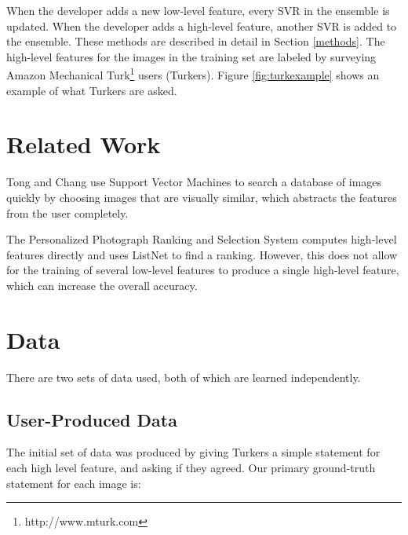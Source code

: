 \documentclass[11pt,letter]{article}
\begin{document}
When the developer adds a new low-level feature, every SVR in the ensemble is updated. When the developer adds a high-level feature, another SVR is added to the ensemble. These methods are described in detail in Section \ref{methods}. The high-level features for the images in the training set are labeled by surveying Amazon Mechanical Turk\footnote{http://www.mturk.com} users (Turkers). Figure \ref{fig:turkexample} shows an example of what Turkers are asked.

\begin{figure*}[h!]
  \centering
  \caption{This is what Turkers see when rating the image. Here, there are two high level features: blur quality and exposure quality. The first statement (``This image is high quality'') is the ground truth. See Section \ref{turkdata} for details.}
  \label{fig:turkexample}
\end{figure*}

\section{Related Work}
Tong and Chang\cite{Tong:2001:SVM:500141.500159} use Support Vector Machines to search a database of images quickly by choosing images that are visually similar, which abstracts the features from the user completely.

The Personalized Photograph Ranking and Selection System\cite{Yeh:2010:PPR:1873951.1873963} computes high-level features directly and uses ListNet\cite{Cao:2007:LRP:1273496.1273513} to find a ranking. However, this does not allow for the training of several low-level features to produce a single high-level feature, which can increase the overall accuracy.

\section{Data}

There are two sets of data used, both of which are learned independently.

\subsection{User-Produced Data}
\label{turkdata}
The initial set of data was produced by giving Turkers a simple statement for each high level feature, and asking if they agreed. Our primary ground-truth statement for each image is:
\end{document}
